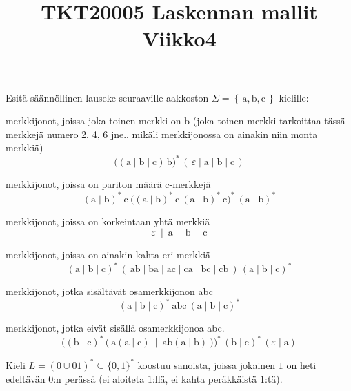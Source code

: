 \documentclass[12pt,a4paper]{article}
\title{TKT20005 Laskennan mallit Viikko4}
\date{}
\newcommand{\set}[1]{\left\{\,#1\,\right\}}
\newcommand{\rma}{\mathrm{a}}
\newcommand{\rmb}{\mathrm{b}}
\newcommand{\rmc}{\mathrm{c}}
\begin{document}
\maketitle

Esitä säännöllinen lauseke seuraaville aakkoston
$\Sigma=\set{\rma,\rmb,\rmc}$ kielille:
\begin{kohta}
\item merkkijonot, joissa joka toinen merkki on b (joka toinen merkki tarkoittaa tässä merkkejä numero 2, 4, 6 jne., mikäli merkkijonossa on ainakin niin monta merkkiä)
\[
\big((\mathrm{a}\mid\mathrm{b}\mid\mathrm{c})\,\mathrm{b}\big)^{*}\,(\,\varepsilon\mid\mathrm{a}\mid\mathrm{b}\mid\mathrm{c}\,)
\] 
\item merkkijonot, joissa on pariton määrä c-merkkejä
\[
(\mathrm{a}\mid\mathrm{b})^{*}\ \mathrm{c}\ \big((\mathrm{a}\mid\mathrm{b})^{*}\ \mathrm{c}\ (\mathrm{a}\mid\mathrm{b})^{*}\ \mathrm{c}\big)^{*}\ (\mathrm{a}\mid\mathrm{b})^{*}
\]
\item merkkijonot, joissa on korkeintaan yhtä merkkiä
\[
\varepsilon \ \mid\ \mathrm{a}\ \mid\ \mathrm{b}\ \mid\ \mathrm{c}
\]
\item merkkijonot, joissa on ainakin kahta eri merkkiä
\[
(\mathrm{a}\mid\mathrm{b}\mid\mathrm{c})^{*}\,(\ \mathrm{ab}\mid\mathrm{ba}\mid\mathrm{ac}\mid\mathrm{ca}\mid\mathrm{bc}\mid\mathrm{cb}\ )\,(\mathrm{a}\mid\mathrm{b}\mid\mathrm{c})^{*}
\]
\item merkkijonot, jotka sisältävät osamerkkijonon abc
\[
(\mathrm{a}\mid\mathrm{b}\mid\mathrm{c})^{*}\ \mathrm{abc}\ (\mathrm{a}\mid\mathrm{b}\mid\mathrm{c})^{*}
\]
\item merkkijonot, jotka eivät sisällä osamerkkijonoa abc.
\[
\Big( (\mathrm{b}\mid\mathrm{c})^{*}\,\big(\ \mathrm{a}(\mathrm{a}\mid\mathrm{c})\ \mid\ \mathrm{ab}(\mathrm{a}\mid\mathrm{b})\ \big) \Big)^{*}\,
(\mathrm{b}\mid\mathrm{c})^{*}\,(\varepsilon\mid \mathrm{a})
\]
\end{kohta}






\pagebreak
{}
Kieli $L=(0\cup 01)^{*}\subseteq\{0,1\}^*$ koostuu sanoista, joissa jokainen $1$ on heti
edeltävän $0$:n perässä (ei aloiteta $1$:llä, ei kahta peräkkäistä $1$:tä).
\end{document}
